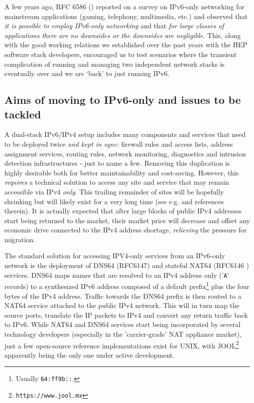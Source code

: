 
A few years ago, RFC 6586 (\cite{rfc}) reported on a survey on IPv6-only
networking for mainstream applications (gaming, telephony,
multimedia, etc.) and observed that {\it \guillemotleft it is possible to employ IPv6-only
networking\guillemotright} and that {\it \guillemotleft for large classes of applications
there are no downsides or the downsides are negligible\guillemotright}.
This, along with the good working relations we established over
the past years with the HEP software stack developers,
encouraged us to test 
scenarios where the transient complication of running and managing
two independent network stacks is eventually over and we are `back' to just
running IPv6.

\subsection{Aims of moving to IPv6-only and issues to be tackled}
\label{ssec:ipv6onlymove}
A dual-stack IPv6/IPv4 setup includes many components and services that need
to be deployed twice {\it and kept in sync}: firewall rules and access
lists, address assignment services, routing rules, network monitoring,
diagnostics and
intrusion detection infrastructures - just to name a few.
Removing this duplication is highly desirable both for better maintainability
and cost-saving.
However, this {\it requires} a technical
solution to access any site and service that may remain accessible via IPv4
{\it only}.
This trailing remainder of sites will be hopefully
shrinking but will likely exist for a very long time (see
e.g. \cite{ipv6trans} and references therein).
It is actually expected that after large blocks of public IPv4
addresses start being returned to the market, their market price will
decrease and offset any economic drive connected to the IPv4 address shortage,
{\it relieving} the pressure for migration.\par

The standard solution for accessing IPV4-only services from an IPv6-only
network is the deployment of DNS64 (RFC6147) and stateful
NAT64 (RFC6146 \cite{rfc}) services. DNS64 maps names that are resolved to
an IPv4 address only ('{\tt A}' records) to a synthesized IPv6 address composed
of a default prefix\footnote{Usually {\tt 64:ff9b::}.} plus the four bytes of
the IPv4 address. Traffic towards the DNS64 prefix is then routed to
a NAT64 service attached to the public IPv4 network. This will in turn map the
source ports, translate the IP packets to IPv4 and convert any return traffic
back to IPv6. While NAT64 and DNS64 services start being incorporated by
several technology developers (especially in the 'carrier-grade' NAT 
appliance market),
just a few open-source reference implementations exist for UNIX, with
JOOL\footnote{\tt https://www.jool.mx} apparently being the only one 
under active development.\par

